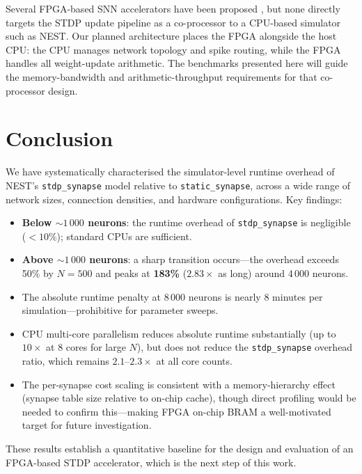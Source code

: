 \documentclass[10pt,twocolumn]{article}
\begin{document}
Several FPGA-based SNN accelerators have been proposed
\cite{cheung2012,sripad2020,han2020}, but none directly targets the
STDP update pipeline as a co-processor to a CPU-based simulator
such as NEST.
Our planned architecture places the FPGA alongside the host CPU:
the CPU manages network topology and spike routing, while the FPGA
handles all weight-update arithmetic.
The benchmarks presented here will guide the memory-bandwidth and
arithmetic-throughput requirements for that co-processor design.

\section{Conclusion}
\label{sec:conclusion}

We have systematically characterised the simulator-level runtime
overhead of NEST's \texttt{stdp\_synapse} model relative to
\texttt{static\_synapse}, across a wide range of network sizes,
connection densities, and hardware configurations.
Key findings:

\begin{itemize}\setlength\itemsep{0pt}
  \item \textbf{Below $\sim\!1\,000$ neurons}: the runtime overhead
        of \texttt{stdp\_synapse} is negligible ($<\!10\%$); standard
        CPUs are sufficient.
  \item \textbf{Above $\sim\!1\,000$ neurons}: a sharp transition
        occurs---the overhead exceeds 50\% by $N\!=\!500$ and peaks
        at \textbf{183\%} ($2.83\times$ as long) around 4\,000 neurons.
  \item The absolute runtime penalty at 8\,000 neurons is nearly 8
        minutes per simulation---prohibitive for parameter sweeps.
  \item CPU multi-core parallelism reduces absolute runtime
        substantially (up to $10\times$ at 8 cores for large $N$),
        but does not reduce the \texttt{stdp\_synapse} overhead ratio,
        which remains $2.1$--$2.3\times$ at all core counts.
  \item The per-synapse cost scaling is consistent with a
        memory-hierarchy effect (synapse table size relative to
        on-chip cache), though direct profiling would be needed to
        confirm this---making FPGA on-chip BRAM a well-motivated
        target for future investigation.
\end{itemize}

These results establish a quantitative baseline for the design and
evaluation of an FPGA-based STDP accelerator, which is the next
step of this work.
\end{document}
